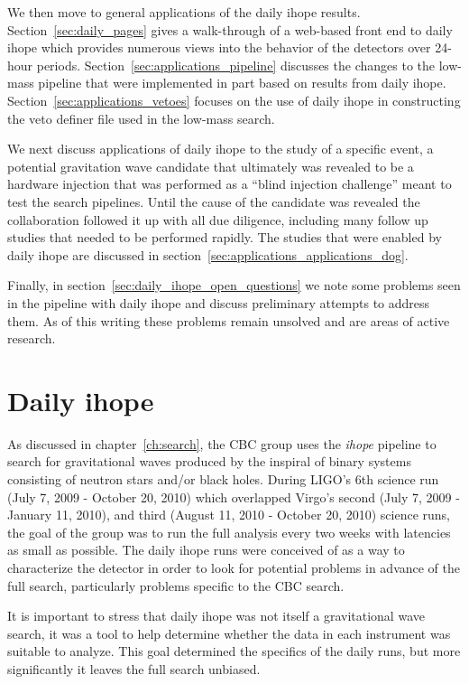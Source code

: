 We then move to general applications of the daily ihope results.
Section~\ref{sec:daily_pages} gives a walk-through of a web-based
front end to daily ihope which provides numerous views into the
behavior of the detectors over 24-hour periods.  
Section~\ref{sec:applications_pipeline} discusses the changes to the
low-mass pipeline that were implemented in part based on results from
daily ihope.  Section~\ref{sec:applications_vetoes} focuses on the use
of daily ihope in constructing the veto definer file used in the
low-mass search.

We next discuss applications of daily ihope to the study of a specific
event, a potential gravitation wave candidate that ultimately was
revealed to be a hardware injection that was performed as a ``blind
injection challenge'' meant to test the search pipelines.  Until the
cause of the candidate was revealed the collaboration followed it up
with all due diligence, including many follow up studies that needed
to be performed rapidly.  The studies that were enabled by daily ihope
are discussed in section~\ref{sec:applications_applications_dog}.

Finally, in section~\ref{sec:daily_ihope_open_questions} we note some
problems seen in the pipeline with daily ihope and discuss preliminary
attempts to address them.  As of this writing these problems remain
unsolved and are areas of active research.



\section{Daily ihope}
\label{sec:daily_ihope}

As discussed in chapter~\ref{ch:search}, the CBC group uses the
\emph{ihope} pipeline to search for gravitational waves produced by
the inspiral of binary systems consisting of neutron stars and/or
black holes.  During LIGO's 6th science run (July 7, 2009 - October
20, 2010) which overlapped Virgo's second (July 7, 2009 - January 11,
2010), and third (August 11, 2010 - October 20, 2010) science runs,
the goal of the group was to run the full analysis every two weeks
with latencies as small as possible.  The daily ihope runs were
conceived of as a way to characterize the detector in order to look
for potential problems in advance of the full search, particularly
problems specific to the CBC search.

It is important to stress that daily ihope was not itself a
gravitational wave search, it was a tool to help determine whether the
data in each instrument was suitable to analyze.  This goal determined
the specifics of the daily runs, but more significantly it leaves the
full search unbiased.

